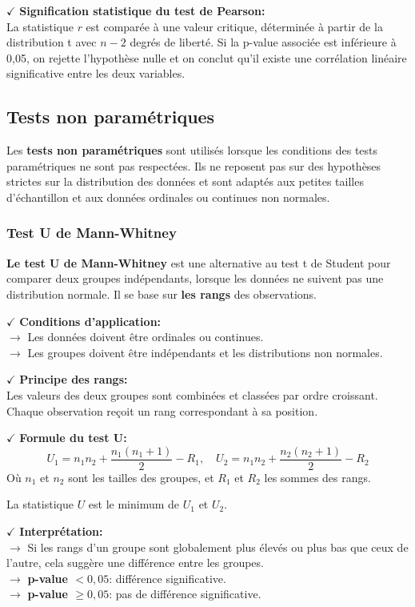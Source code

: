 \textbf{\(\checkmark\)} \textbf{Signification statistique du test de Pearson:}\\
La statistique \( r \) est comparée à une valeur critique, déterminée à partir de la distribution t avec \( n-2 \) degrés de liberté. Si la p-value associée est inférieure à 0,05, on rejette l'hypothèse nulle et on conclut qu'il existe une corrélation linéaire significative entre les deux variables.


\subsection{Tests non paramétriques}

Les \textbf{tests non paramétriques} sont utilisés lorsque les conditions des tests paramétriques ne sont pas respectées. Ils ne reposent pas sur des hypothèses strictes sur la distribution des données et sont adaptés aux petites tailles d'échantillon et aux données ordinales ou continues non normales.
\subsubsection{Test U de Mann-Whitney}

\textbf{Le test U de Mann-Whitney} est une alternative au test t de Student pour comparer deux groupes indépendants, lorsque les données ne suivent pas une distribution normale. Il se base sur \textbf{les rangs} des observations.

\textbf{\(\checkmark\)} \textbf{Conditions d'application:}\\
\textbf{\(\rightarrow\)} Les données doivent être ordinales ou continues.\\
\textbf{\(\rightarrow\)} Les groupes doivent être indépendants et les distributions non normales.

\textbf{\(\checkmark\)} \textbf{Principe des rangs:}\\
Les valeurs des deux groupes sont combinées et classées par ordre croissant. Chaque observation reçoit un rang correspondant à sa position.

\textbf{\(\checkmark\)} \textbf{Formule du test U:}
\[
U_1 = n_1 n_2 + \frac{n_1 (n_1 + 1)}{2} - R_1, \quad U_2 = n_1 n_2 + \frac{n_2 (n_2 + 1)}{2} - R_2
\]
Où \( n_1 \) et \( n_2 \) sont les tailles des groupes, et \( R_1 \) et \( R_2 \) les sommes des rangs.

La statistique \( U \) est le minimum de \( U_1 \) et \( U_2 \).

\textbf{\(\checkmark\)} \textbf{Interprétation:}\\
\textbf{\(\rightarrow\)} Si les rangs d'un groupe sont globalement plus élevés ou plus bas que ceux de l'autre, cela suggère une différence entre les groupes.\\
\textbf{\(\rightarrow\)} \textbf{p-value \( < 0{,}05 \)}: différence significative.\\
\textbf{\(\rightarrow\)} \textbf{p-value \( \geq 0{,}05 \)}: pas de différence significative.
    
